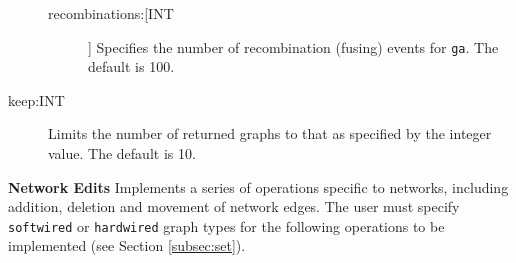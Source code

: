 \begin{description}
\begin{description}
			\item[recombinations:[INT]] Specifies the number of recombination (fusing) events for 
			\texttt{ga}. The default is 100.
			
			
		\end{description}
		
		\item[keep:INT] Limits the number of returned graphs to that as specified by the 
		integer value. The default is 10.
		
	\end{description}
		
		\bigskip
		
		
		\noindent \textbf{Network Edits} Implements a series of operations specific to networks, 
		including addition, deletion and movement of network edges. The user must specify
		\texttt{softwired} or \texttt{hardwired} graph types for the following operations to 
		be implemented (see Section \ref{subsec:set}).
	
